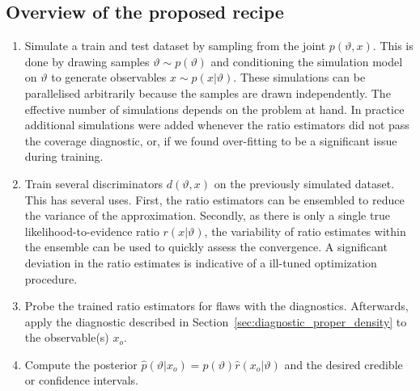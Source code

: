 \documentclass[fleqn,usenatbib]{mnras}
\begin{document}
\subsection{Overview of the proposed recipe}
\label{sec:pipeline}
\begin{enumerate}
\item{
  Simulate a train and test dataset by sampling from the joint $p(\vartheta,x)$.
  This is done by drawing samples $\vartheta\sim p(\vartheta)$ and conditioning the simulation
  model on $\vartheta$ to generate observables $x\sim p(x\vert\vartheta)$. These simulations
  can be parallelised arbitrarily because the samples are drawn independently. The
  effective number of simulations depends on the problem at hand. In practice 
  additional simulations were added whenever the ratio estimators did not pass the coverage
  diagnostic, or, if we found over-fitting to be a significant issue during training.
}
\item{
  Train several discriminators $d(\vartheta, x)$ on the previously simulated dataset.
  This has several uses.
  First, the ratio estimators can be ensembled to reduce the variance of the approximation.
  Secondly, as there is only a single true likelihood-to-evidence ratio $r(x\vert\vartheta)$,
  the variability of ratio estimates within the ensemble can be used to quickly assess the convergence.
  A significant deviation in the ratio estimates is indicative of a ill-tuned optimization procedure.
}
\item Probe the trained ratio estimators for flaws with the diagnostics. Afterwards, apply the diagnostic described in Section~\ref{sec:diagnostic_proper_density} to the observable(s) $x_o$.
  
\item Compute the posterior $\hat{p}(\vartheta\vert x_o) = p(\vartheta)\hat{r}(x_o\vert\vartheta)$ and the
  desired credible or confidence intervals.
\end{enumerate}
\end{document}
